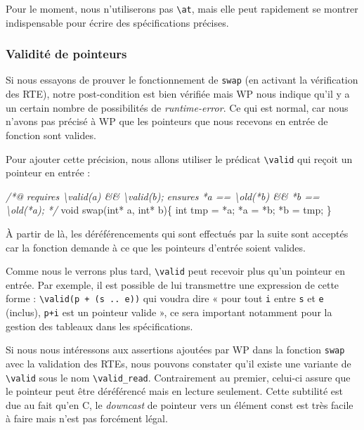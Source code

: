 \documentclass[12pt,francais,]{scrbook}
\newenvironment{Shaded}{}{}
\newcommand{\DataTypeTok}[1]{\textcolor[rgb]{0.56,0.13,0.00}{{#1}}}
\newcommand{\CommentTok}[1]{\textcolor[rgb]{0.38,0.63,0.69}{\textit{{#1}}}}
\newcommand{\NormalTok}[1]{{#1}}
\begin{document}
Pour le moment, nous n'utiliserons pas \texttt{\textbackslash{}at}, mais
elle peut rapidement se montrer indispensable pour écrire des
spécifications précises.

\subsubsection{Validité de pointeurs}\label{validituxe9-de-pointeurs}

Si nous essayons de prouver le fonctionnement de \texttt{swap} (en
activant la vérification des RTE), notre post-condition est bien
vérifiée mais WP nous indique qu'il y a un certain nombre de
possibilités de \emph{runtime-error}. Ce qui est normal, car nous
n'avons pas précisé à WP que les pointeurs que nous recevons en entrée
de fonction sont valides.

Pour ajouter cette précision, nous allons utiliser le prédicat
\texttt{\textbackslash{}valid} qui reçoit un pointeur en entrée :

\begin{footnotesize}\begin{Shaded}
\begin{Highlighting}[]
\CommentTok{/*@}
\CommentTok{  requires \textbackslash{}valid(a) && \textbackslash{}valid(b);}
\CommentTok{  ensures  *a == \textbackslash{}old(*b) && *b == \textbackslash{}old(*a);}
\CommentTok{*/}
\DataTypeTok{void} \NormalTok{swap(}\DataTypeTok{int}\NormalTok{* a, }\DataTypeTok{int}\NormalTok{* b)\{}
  \DataTypeTok{int} \NormalTok{tmp = *a;}
  \NormalTok{*a = *b;}
  \NormalTok{*b = tmp;}
\NormalTok{\}}
\end{Highlighting}
\end{Shaded}\end{footnotesize}

À partir de là, les déréférencements qui sont effectués par la suite
sont acceptés car la fonction demande à ce que les pointeurs d'entrée
soient valides.

Comme nous le verrons plus tard, \texttt{\textbackslash{}valid} peut
recevoir plus qu'un pointeur en entrée. Par exemple, il est possible de
lui transmettre une expression de cette forme :
\texttt{\textbackslash{}valid(p\ +\ (s\ ..\ e))} qui voudra dire « pour
tout \texttt{i} entre \texttt{s} et \texttt{e} (inclus), \texttt{p+i}
est un pointeur valide », ce sera important notamment pour la gestion
des tableaux dans les spécifications.

Si nous nous intéressons aux assertions ajoutées par WP dans la fonction
\texttt{swap} avec la validation des RTEs, nous pouvons constater qu'il
existe une variante de \texttt{\textbackslash{}valid} sous le nom
\texttt{\textbackslash{}valid\_read}. Contrairement au premier, celui-ci
assure que le pointeur peut être déréférencé mais en lecture seulement.
Cette subtilité est due au fait qu'en C, le \emph{downcast} de pointeur
vers un élément const est très facile à faire mais n'est pas forcément
légal.
\end{document}
